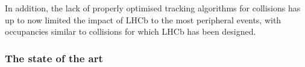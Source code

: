 \documentclass[a4paper,11pt]{article}
\newcommand{\ER}{ER}
\begin{document}
In addition, the lack of properly optimised tracking algorithms for 
 \PbPb collisions has up to now limited the impact of LHCb to the most peripheral events, with occupancies similar to \pp collisions for which LHCb has been designed.








\subsubsection{The state of the art} \label{sec:stateoftheart}
\end{document}
